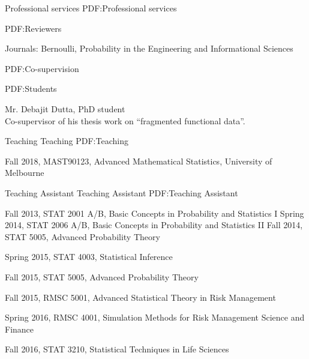 \documentclass[letterpaper,MMMyyyy,nonstopmode]{simpleresumecv}
\begin{document}
\begin{Body}



{Professional services}
{PDF:Professional services}


{PDF:Reviewers}

\begingroup

Journals: Bernoulli, Probability in the Engineering and Informational Sciences
\endgroup


{PDF:Co-supervision}

{PDF:Students}


Mr. Debajit Dutta, PhD student \\
Co-supervisor of his thesis work on ``fragmented functional data''. %



\Section
{Teaching}
{Teaching}
{PDF:Teaching }

\BulletItem
Fall 2018, MAST90123, Advanced Mathematical Statistics, University of Melbourne




\Section
{Teaching Assistant}
{Teaching Assistant}
{PDF:Teaching Assistant}

\BulletItem
Fall 2013, STAT 2001 A/B, Basic Concepts in Probability and Statistics I 
\BulletItem
Spring 2014, STAT 2006 A/B, Basic Concepts in Probability and Statistics II
\BulletItem
Fall 2014, STAT 5005, Advanced Probability Theory %

\BulletItem
Spring 2015, STAT 4003, Statistical Inference%

\BulletItem
Fall 2015, STAT 5005, Advanced Probability Theory%

\BulletItem
Fall 2015, RMSC 5001, Advanced Statistical  Theory in Risk Management%

\BulletItem
Spring 2016, RMSC 4001, Simulation Methods for Risk Management Science and Finance %

\BulletItem
Fall 2016, STAT 3210, Statistical Techniques in Life Sciences%



\end{Body}
\end{document}
